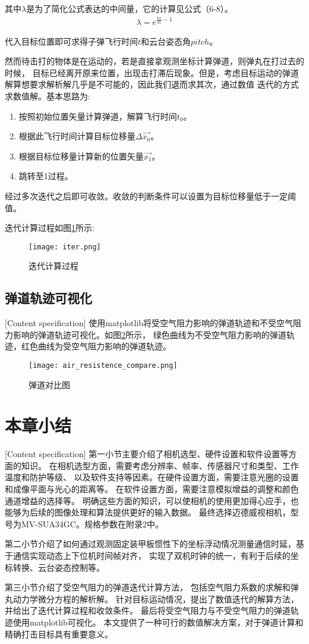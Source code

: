 其中$\lambda$是为了简化公式表达的中间量，它的计算见公式（6-8）。
\begin{gather}
    \lambda = e^{\frac{kx}{m}-1}
\end{gather}

代入目标位置即可求得子弹飞行时间$t$和云台姿态角$pitch$。\par
然而待击打的物体是在运动的，若是直接拿观测坐标计算弹道，则弹丸在打过去的时候，
目标已经离开原来位置，出现击打滞后现象。但是，考虑目标运动的弹道解算想要求解析解几乎是不可能的，因此我们退而求其次，通过数值
迭代的方式求数值解。基本思路为:
\begin{enumerate}
    \item 按照初始位置矢量计算弹道，解算飞行时间$t_0$。
    \item 根据此飞行时间计算目标位移量$\Delta \vec{x_0}$。
    \item 根据目标位移量计算新的位置矢量$\vec{x_1}$。
    \item 跳转至1过程。
\end{enumerate}

经过多次迭代之后即可收敛。收敛的判断条件可以设置为目标位移量低于一定阈值。

迭代计算过程如图\ref{迭代计算过程}所示:

\begin{figure}[H]
    \centering
    \texttt{[image: iter.png]} 
    \caption{迭代计算过程} 
    \label{迭代计算过程}
\end{figure}

\subsection{弹道轨迹可视化}[Content specification]
使用matplotlib将受空气阻力影响的弹道轨迹和不受空气阻力影响的弹道轨迹可视化。如图\ref{弹道对比}所示，
绿色曲线为不受空气阻力影响的弹道轨迹，红色曲线为受空气阻力影响的弹道轨迹。
\begin{figure}[H]
    \centering
    \texttt{[image: air\_resistence\_compare.png]} 
    \caption{弹道对比图} 
    \label{弹道对比}
\end{figure}






\section{本章小结}[Content specification]
第一小节主要介绍了相机选型、硬件设置和软件设置等方面的知识。
在相机选型方面，需要考虑分辨率、帧率、传感器尺寸和类型、工作温度和防护等级、
以及软件支持等因素。在硬件设置方面，需要注意光圈的设置和成像平面与光心的距离等。
在软件设置方面，需要注意模拟增益的调整和颜色通道增益的选择等。
明确这些方面的知识，可以使相机的使用更加得心应手，也能够为后续的图像处理和算法提供更好的输入数据。
最终选择迈德威视相机，型号为MV-SUA34GC。规格参数在附录2中。

\par
第二小节介绍了如何通过观测固定装甲板惯性下的坐标浮动情况测量通信时延，基于通信实现动态上下位机时间帧对齐，
实现了双机时钟的统一，有利于后续的坐标转换、云台姿态控制等。

\par
第三小节介绍了受空气阻力的弹道迭代计算方法，
包括空气阻力系数的求解和弹丸动力学微分方程的解析解。
针对目标运动情况，提出了数值迭代的解算方法，并给出了迭代计算过程和收敛条件。
最后将受空气阻力与不受空气阻力的弹道轨迹使用matplotlib可视化。
本文提供了一种可行的数值解决方案，对于弹道计算和精确打击目标具有重要意义。